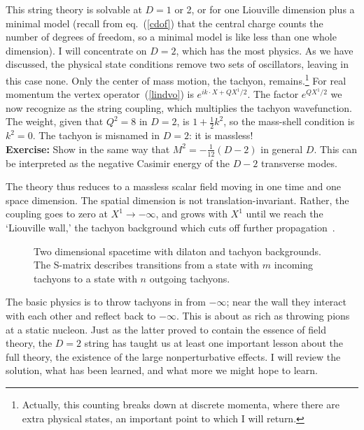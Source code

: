 This string theory is solvable at $D =1$ or 2, or for one Liouville
dimension plus a minimal model (recall from eq.~(\ref{cdof})
that the central charge counts the number of degrees of freedom,
so a minimal model is like less than one whole dimension).
I will concentrate on
$D=2$, which has the most physics.  As we have discussed, the
physical state conditions remove two sets of oscillators, leaving
in this case none.  Only the center of mass motion, the tachyon,
remains.\footnote {Actually, this counting breaks down at discrete
momenta, where there are extra physical states, an important point
to which I will return.}  For real momentum the vertex
operator~(\ref{lindvo}) is $e^{i k \cdot X + QX^1/2}$.  The factor
$e^{QX^1/2}$ we now recognize as the string coupling, which
multiplies the tachyon wavefunction. The weight, given that $Q^2 =
8$ in $D=2$, is $1 +
\frac{1}{2} k^2$, so the mass-shell condition is $k^2 = 0$.  The
tachyon is misnamed in $D=2$: it is massless!\\[3pt]
{\bf Exercise:} Show in the same way that $M^2 = -\frac{1}{12}(D -
2)$ in general
$D$. This can be interpreted as the negative Casimir energy of the
$D-2$ transverse modes.

The theory thus reduces to a massless scalar field moving in one
time and one space dimension.  The spatial dimension is not
translation-invariant. Rather, the coupling goes to zero at $X^1 \to
-\infty$, and grows with $X^1$ until we reach the `Liouville wall,'
the tachyon background which cuts off further
propagation~\cite{Pcrit}.
\begin{figure}
\begin{center}
\leavevmode
{}
\end{center}
\caption[]{Two dimensional spacetime with dilaton and tachyon
backgrounds.  The S-matrix describes transitions from a state
with $m$ incoming tachyons to a state with $n$ outgoing
tachyons.}
\end{figure}
The basic physics is
to throw tachyons in from $-\infty$; near the wall they interact
with each other and reflect back to $-\infty$.  This is about as
rich as throwing pions at a static nucleon.  Just as the latter
proved to contain the essence of field theory, the $D=2$ string
has taught us at least one important lesson about the full theory,
the existence of the large nonperturbative effects.  I will review
the solution, what has been learned, and what more we might hope to
learn.


